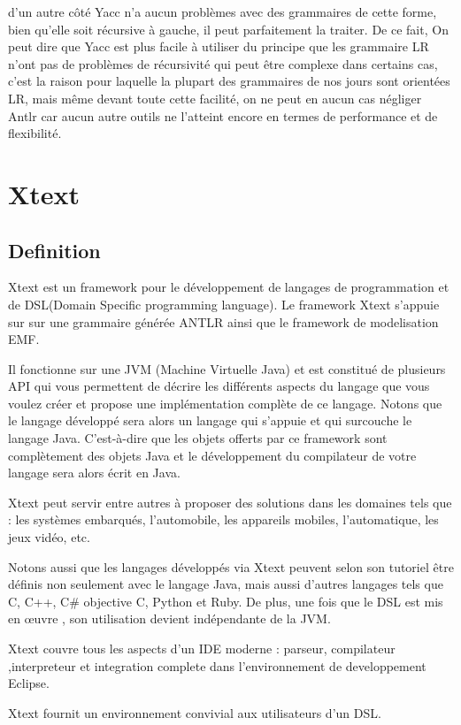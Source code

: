 \documentclass{article}
\begin{document}
d’un autre côté Yacc n’a aucun problèmes avec des grammaires de cette forme, bien qu’elle soit récursive à gauche, il peut parfaitement la traiter.
De ce fait, On peut dire que Yacc est plus facile à utiliser du principe que les grammaire LR n’ont pas de problèmes de récursivité qui peut être complexe dans certains cas, c’est la raison pour laquelle la plupart des grammaires de nos jours sont orientées LR, mais même devant toute cette facilité, on ne peut en aucun cas négliger Antlr car aucun autre outils ne l’atteint encore en termes de performance et de flexibilité.

\section{Xtext}
\subsection{Definition}
Xtext est un framework pour le développement de langages de programmation et de DSL(Domain Specific programming language).
Le framework Xtext s’appuie sur sur une grammaire générée ANTLR ainsi que le framework de modelisation EMF.

Il fonctionne sur une JVM (Machine Virtuelle Java) et est constitué de plusieurs API qui vous permettent de décrire les différents aspects du langage que vous voulez créer et propose une implémentation complète de ce langage. Notons que le langage développé sera alors un langage qui s'appuie et qui surcouche le langage Java. C'est-à-dire que les objets offerts par ce framework sont complètement des objets Java et le développement du compilateur de votre langage sera alors écrit en Java.

Xtext peut servir entre autres à proposer des solutions dans les domaines tels que : les systèmes embarqués, l'automobile, les appareils mobiles, l'automatique, les jeux vidéo, etc.

Notons aussi que les langages développés via Xtext peuvent selon son tutoriel être définis non seulement avec le langage Java, mais aussi d'autres langages tels que C, C++, C\# objective C, Python et Ruby. De plus, une fois que le DSL est mis en œuvre , son utilisation devient indépendante de la JVM. 

Xtext couvre tous les aspects d’un IDE moderne : parseur, compilateur ,interpreteur et integration complete dans l’environnement de developpement Eclipse.

Xtext fournit un environnement convivial aux utilisateurs d’un DSL.
\end{document}
